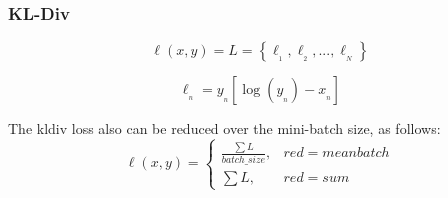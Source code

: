 \subsubsection{KL-Div}
\begin{equation}
    \ell(x, y) = L = \left\{ \ell_{_{1}}, \ell_{_{2}}, ..., \ell_{_{N}} \right\} 
\end{equation}

\begin{equation}
    \ell_{_{n}} = y_{_{n}} \left[ \log \left( y_{_{n}} \right) - x_{_{n}} \right]
\end{equation}

The kldiv loss also can be reduced over the mini-batch size, as follows:
\begin{equation}
    \ell(x, y) = \begin{cases}
        \frac{\sum {L}}{batch\_size}, & red=meanbatch \\
        \sum {L}, & red=sum
    \end{cases}
\end{equation}